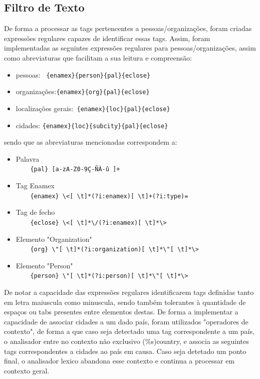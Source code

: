 \subsection{Filtro de Texto}
\label{seq:enamex-filtro}

De forma a processar as tags pertencentes a pessoas/organizações, foram criadas expressões regulares capazes de identificar essas tags.
Assim, foram implementadas as seguintes expressões regulares para pessoas/organizações, assim como abreviaturas que facilitam a sua leitura e compreensão:

\begin{itemize}
\item pessoas: \verb! {enamex}{person}{pal}{eclose}! 
\item organizações:\verb!{enamex}{org}{pal}{eclose}!
\item localizações gerais:\verb! {enamex}{loc}{pal}{eclose}!
\item cidades: \verb!{enamex}{loc}{subcity}{pal}{eclose}!
\end{itemize}

sendo que as abreviaturas mencionadas correspondem a:

\begin{itemize}
\item Palavra \\
	\verb!    {pal} [a-zA-Z0-9Ç-ÑÀ-û ]+!
\item Tag Enamex \\
	\verb!    {enamex} \<[ \t]*(?i:enamex)[ \t]+(?i:type)=!
\item Tag de fecho \\
	\verb!    {eclose} \<[ \t]*\/(?i:enamex)[ \t]*\>!
\item Elemento "Organization"\\
	\verb!    {org} \"[ \t]*(?i:organization)[ \t]*\"[ \t]*\>!
\item Elemento "Person"\\
	\verb!    {person} \"[ \t]*(?i:person)[ \t]*\"[ \t]*\>!
\end{itemize}


De notar a capacidade das expressões regulares identificarem tags definidas tanto em letra maiuscula como minuscula, sendo também tolerantes à quantidade de espaços ou tabs presentes entre elementos destas.
De forma a implementar a capacidade de associar cidades a um dado país, foram utilizados "operadores de contexto", de forma a que caso seja detectado uma tag correspondente a um país, o analisador entre no contexto não exclusivo (\%s)country, e associa as seguintes tags correspondentes a cidades ao país em causa. Caso seja detetado um ponto final, o analisador lexico abandona esse contexto e continua a processar em contexto geral. 

